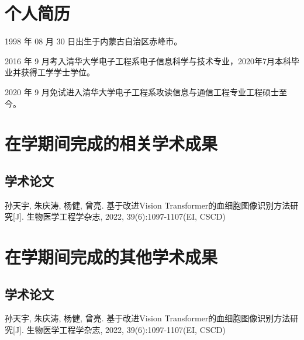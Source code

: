 
\begin{resume}

  \section*{个人简历}

  1998 年 08 月 30 日出生于内蒙古自治区赤峰市。

  2016 年 9 月考入清华大学电子工程系电子信息科学与技术专业，2020年7月本科毕业并获得工学学士学位。

  2020 年 9 月免试进入清华大学电子工程系攻读信息与通信工程专业工程硕士至今。


  \section*{在学期间完成的相关学术成果}

  \subsection*{学术论文}

  \begin{achievements}
    \item 孙天宇, 朱庆涛, 杨健, 曾亮. 基于改进Vision Transformer的血细胞图像识别方法研究[J]. 生物医学工程学杂志, 2022, 39(6):1097-1107(EI, CSCD)
  \end{achievements}

  \section*{在学期间完成的其他学术成果}

  \subsection*{学术论文}

  \begin{achievements}
    \item 孙天宇, 朱庆涛, 杨健, 曾亮. 基于改进Vision Transformer的血细胞图像识别方法研究[J]. 生物医学工程学杂志, 2022, 39(6):1097-1107(EI, CSCD)
  \end{achievements}

\end{resume}
